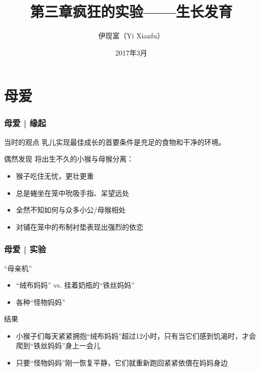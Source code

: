



\title[生长发育]{第三章\quad 疯狂的实验——生长发育}
\author[Yixf]{伊现富（Yi Xianfu）}
\date{2017年3月}



\section{母爱}
\begin{frame}
  \frametitle{母爱 | 缘起}
  \begin{block}{当时的观点}
    乳儿实现最佳成长的首要条件是充足的食物和干净的环境。
  \end{block}
  \pause
  \begin{block}{偶然发现}
    将出生不久的小猴与母猴分离：
    \begin{itemize}
      \item 猴子吃住无忧，更壮更重
      \item 总是蜷坐在笼中吮吸手指、呆望远处
      \item 全然不知如何与众多小公/母猴相处
      \item 对铺在笼中的布制衬垫表现出强烈的依恋
    \end{itemize}
  \end{block}
\end{frame}

\begin{frame}
  \frametitle{母爱 | 实验}
  \begin{block}{“母亲机”}
    \begin{itemize}
      \item “绒布妈妈” vs. 挂着奶瓶的“铁丝妈妈”
      \item 各种“怪物妈妈”
    \end{itemize}
  \end{block}
  \pause
  \begin{block}{结果}
    \begin{itemize}
      \item 小猴子们每天紧紧拥抱“绒布妈妈”超过12小时，只有当它们感到饥渴时，才会爬到“铁丝妈妈”身上一会儿
      \item 只要“怪物妈妈”刚一恢复平静，它们就重新跑回紧紧依偎在妈妈身边
    \end{itemize}
  \end{block}
\end{frame}

